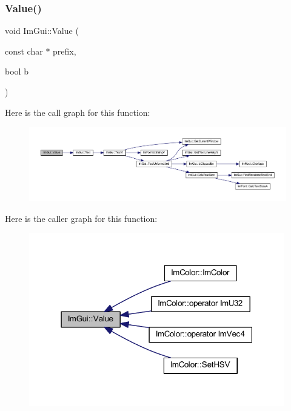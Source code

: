 \mbox{\label{namespace_im_gui_a1b3324308e43eeded5c3599fa0f03e85}} 
\subsubsection{\texorpdfstring{Value()}{Value()}\hspace{0.1cm}{\footnotesize\ttfamily [1/4]}}
{\footnotesize\ttfamily void Im\+Gui\+::\+Value (\begin{DoxyParamCaption}\item[{const char $\ast$}]{prefix,  }\item[{bool}]{b }\end{DoxyParamCaption})}

Here is the call graph for this function\+:
\nopagebreak
\begin{figure}[H]
\begin{center}
\leavevmode
\includegraphics[width=350pt]{namespace_im_gui_a1b3324308e43eeded5c3599fa0f03e85_cgraph}
\end{center}
\end{figure}
Here is the caller graph for this function\+:
\nopagebreak
\begin{figure}[H]
\begin{center}
\leavevmode
\includegraphics[width=316pt]{namespace_im_gui_a1b3324308e43eeded5c3599fa0f03e85_icgraph}
\end{center}
\end{figure}
\mbox{\label{namespace_im_gui_a654ceb70f2dd1598f88861f54764ee08}} 

